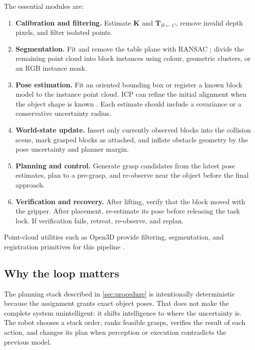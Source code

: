 \documentclass{article}
\begin{document}
The essential modules are:
\begin{enumerate}[leftmargin=1.3em,itemsep=2pt,topsep=2pt]
  \item \textbf{Calibration and filtering.} Estimate $\mathbf{K}$ and
    $\mathbf{T}_{B\leftarrow C}$, remove invalid depth pixels, and filter
    isolated points.
  \item \textbf{Segmentation.} Fit and remove the table plane with RANSAC
    \citep{fischler1981ransac}; divide the remaining point cloud into block
    instances using colour, geometric clusters, or an RGB instance mask.
  \item \textbf{Pose estimation.} Fit an oriented bounding box or register a
    known block model to the instance point cloud. ICP can refine the initial
    alignment when the object shape is known
    \citep{rusinkiewicz2001efficient}. Each estimate should include a covariance
    or a conservative uncertainty radius.
  \item \textbf{World-state update.} Insert only currently observed blocks into
    the collision scene, mark grasped blocks as attached, and inflate obstacle
    geometry by the pose uncertainty and planner margin.
  \item \textbf{Planning and control.} Generate grasp candidates from the latest
    pose estimates, plan to a pre-grasp, and re-observe near the object before
    the final approach.
  \item \textbf{Verification and recovery.} After lifting, verify that the block
    moved with the gripper. After placement, re-estimate its pose before
    releasing the task lock. If verification fails, retreat, re-observe, and
    replan.
\end{enumerate}
Point-cloud utilities such as Open3D provide filtering, segmentation, and
registration primitives for this pipeline \citep{zhou2018open3d}.

\subsection{Why the loop matters}

The planning stack described in \cref{sec:procedure} is intentionally
deterministic because the assignment grants exact object poses. That does not
make the complete system unintelligent: it shifts intelligence to where the
uncertainty is. The robot chooses a stack order, ranks feasible grasps, verifies
the result of each action, and changes its plan when perception or execution
contradicts the previous model.
\end{document}
